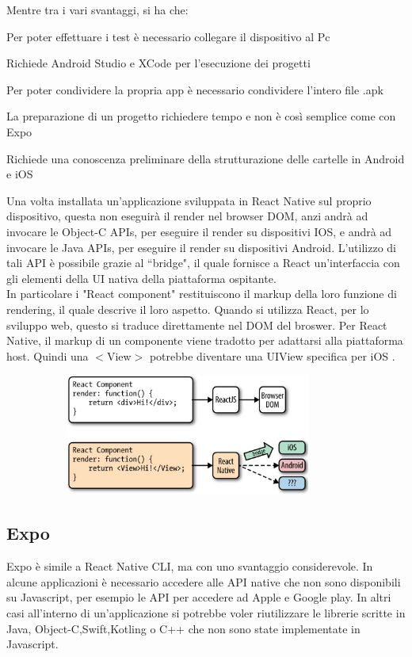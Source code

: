 Mentre tra i vari svantaggi, si ha che:
\begin{list}{*}{}
      \item Per poter effettuare i test \`e necessario collegare il dispositivo al Pc
      \item Richiede Android Studio e XCode per l'esecuzione dei progetti
      \item Per poter condividere la propria app \`e necessario condividere l'intero file .apk
      \item La preparazione di un progetto richiedere tempo e non \`e cos\`i  semplice come con Expo
      \item Richiede una conoscenza preliminare della strutturazione delle cartelle in Android e iOS
\end{list}

Una volta installata un'applicazione sviluppata in React Native sul proprio dispositivo, questa non eseguir\`a il render nel browser DOM, anzi andr\`a ad invocare le Object-C APIs, per eseguire il render su dispositivi IOS,
e andr\`a ad invocare le Java APIs, per eseguire il render su dispositivi Android. L'utilizzo di tali API \`e possibile grazie al ``bridge", il quale fornisce a React un'interfaccia con gli elementi
della UI nativa della piattaforma ospitante.\\ In particolare i "React component" restituiscono il markup della loro funzione di rendering,
il quale descrive il loro aspetto. Quando si utilizza React, per lo sviluppo web, questo si traduce direttamente nel DOM del broswer. Per React Native, il markup di un componente viene tradotto per adattarsi alla piattaforma host.
Quindi una $<$View$>$ potrebbe diventare una UIView specifica per iOS \cite{ReactNative} \cite{ReactNativeCLI:Expo}.

\begin{figure}[h]
      \centering
      \includegraphics[width=10cm, height=4cm]{images/ReactRendering.jpg}
      \caption[differenzeiteot]{}
      \label{fig:ReactRendering}
\end{figure}


\subsection{Expo}
Expo \`e simile a React Native CLI, ma con uno svantaggio considerevole. In alcune applicazioni \`e necessario
accedere alle API native che non sono disponibili su Javascript, per esempio le API per accedere ad Apple e Google play.
In altri casi all'interno di un'applicazione si
potrebbe voler riutilizzare le librerie scritte in Java, Object-C,Swift,Kotling o C++ che non sono state implementate in Javascript.

